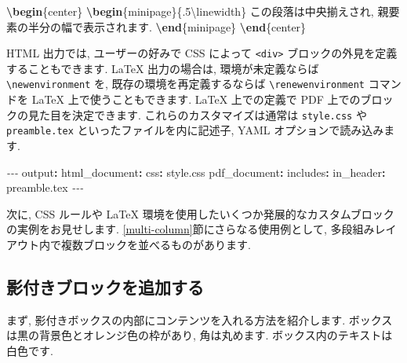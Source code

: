 \documentclass[
  11pt,
]{bxjsreport}
\newenvironment{Shaded}{\begin{snugshade}}{\end{snugshade}}
\newcommand{\AttributeTok}[1]{\textcolor[rgb]{0.77,0.63,0.00}{#1}}
\newcommand{\ExtensionTok}[1]{#1}
\newcommand{\FunctionTok}[1]{\textcolor[rgb]{0.00,0.00,0.00}{#1}}
\newcommand{\KeywordTok}[1]{\textcolor[rgb]{0.13,0.29,0.53}{\textbf{#1}}}
\newcommand{\NormalTok}[1]{#1}
\newcommand{\PreprocessorTok}[1]{\textcolor[rgb]{0.56,0.35,0.01}{\textit{#1}}}
\begin{document}
\begin{Shaded}
\begin{Highlighting}[]
\KeywordTok{\textbackslash{}begin}\NormalTok{\{}\ExtensionTok{center}\NormalTok{\}}
\KeywordTok{\textbackslash{}begin}\NormalTok{\{}\ExtensionTok{minipage}\NormalTok{\}\{.5}\FunctionTok{\textbackslash{}linewidth}\NormalTok{\}}
\NormalTok{この段落は中央揃えされ, 親要素の半分の幅で表示されます.}
\KeywordTok{\textbackslash{}end}\NormalTok{\{}\ExtensionTok{minipage}\NormalTok{\}}
\KeywordTok{\textbackslash{}end}\NormalTok{\{}\ExtensionTok{center}\NormalTok{\}}
\end{Highlighting}
\end{Shaded}

HTML 出力では, ユーザーの好みで CSS によって \texttt{\textless{}div\textgreater{}} ブロックの外見を定義することもできます. LaTeX 出力の場合は, 環境が未定義ならば \texttt{\textbackslash{}newenvironment} を, 既存の環境を再定義するならば \texttt{\textbackslash{}renewenvironment} コマンドを LaTeX 上で使うこともできます. LaTeX 上での定義で PDF 上でのブロックの見た目を決定できます. これらのカスタマイズは通常は \texttt{style.css} や \texttt{preamble.tex} といったファイルを内に記述子, YAML オプションで読み込みます.

\begin{Shaded}
\begin{Highlighting}[]
\PreprocessorTok{{-}{-}{-}}
\FunctionTok{output}\KeywordTok{:}
\AttributeTok{  }\FunctionTok{html\_document}\KeywordTok{:}
\AttributeTok{    }\FunctionTok{css}\KeywordTok{:}\AttributeTok{ style.css}
\AttributeTok{  }\FunctionTok{pdf\_document}\KeywordTok{:}
\AttributeTok{    }\FunctionTok{includes}\KeywordTok{:}
\AttributeTok{      }\FunctionTok{in\_header}\KeywordTok{:}\AttributeTok{ preamble.tex}
\PreprocessorTok{{-}{-}{-}}
\end{Highlighting}
\end{Shaded}

次に, CSS ルールや LaTeX 環境を使用したいくつか発展的なカスタムブロックの実例をお見せします. \ref{multi-column}節にさらなる使用例として, 多段組みレイアウト内で複数ブロックを並べるものがあります.

\hypertarget{block-shaded}{%
\subsection{影付きブロックを追加する}\label{block-shaded}}

まず, 影付きボックスの内部にコンテンツを入れる方法を紹介します. ボックスは黒の背景色とオレンジ色の枠があり, 角は丸めます. ボックス内のテキストは白色です.
\end{document}

